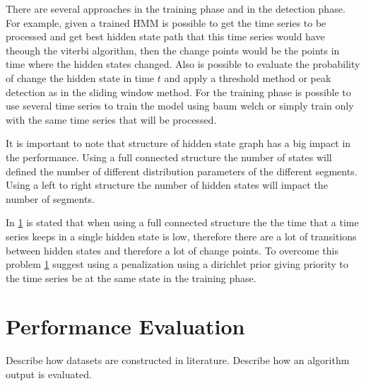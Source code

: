 There are several approaches in the training phase and in the detection phase. For example, given a trained HMM is possible to get the time series to be processed and get best hidden state path that this time series would have theough the viterbi algorithm, then the change points would be the points in time where the hidden states changed. Also is possible to evaluate the probability of change the hidden state in time $t$ and apply a threshold method or peak detection as in the sliding window method. For the training phase is possible to use several time series to train the model using baum welch or simply train only with the same time series that will be processed.

It is important to note that structure of hidden state graph has a big impact in the performance. Using a full connected structure the number of states will defined the number of different distribution parameters of the different segments. Using a left to right structure the number of hidden states will impact the number of segments.

In \ref{} is stated that when using a full connected structure the the time that a time series keeps in a single hidden state is low, therefore there are a lot of transitions between hidden states and therefore a lot of change points. To overcome this problem \ref{} suggest using a penalization using a dirichlet prior giving priority to the time series be at the same state in the training phase.


\section{Performance Evaluation}
  Describe how datasets are constructed in literature. Describe how an algorithm output is evaluated.

